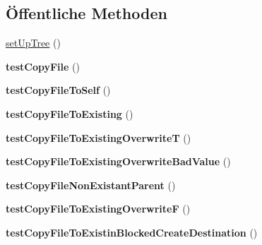 \subsection*{Öffentliche Methoden}
\begin{DoxyCompactItemize}
\item 
\mbox{\hyperlink{class_sabre_1_1_d_a_v_1_1_http_copy_test_aa1b891fcf2e616ce62273fd4fa173a90}{set\+Up\+Tree}} ()
\item 
\mbox{\label{class_sabre_1_1_d_a_v_1_1_http_copy_test_a1530fba319f8a4e55749ebdebb746da1}} 
{\bfseries test\+Copy\+File} ()
\item 
\mbox{\label{class_sabre_1_1_d_a_v_1_1_http_copy_test_a030a4723249e1176729c60753708c58a}} 
{\bfseries test\+Copy\+File\+To\+Self} ()
\item 
\mbox{\label{class_sabre_1_1_d_a_v_1_1_http_copy_test_a573bde730470604b682ac504487cecc3}} 
{\bfseries test\+Copy\+File\+To\+Existing} ()
\item 
\mbox{\label{class_sabre_1_1_d_a_v_1_1_http_copy_test_a6d9f95ad763363ed5166150ea71b62d0}} 
{\bfseries test\+Copy\+File\+To\+Existing\+OverwriteT} ()
\item 
\mbox{\label{class_sabre_1_1_d_a_v_1_1_http_copy_test_a08087f2022d8a2dd4cb4a858a0e31395}} 
{\bfseries test\+Copy\+File\+To\+Existing\+Overwrite\+Bad\+Value} ()
\item 
\mbox{\label{class_sabre_1_1_d_a_v_1_1_http_copy_test_ac643926130aac131adf79b5508326891}} 
{\bfseries test\+Copy\+File\+Non\+Existant\+Parent} ()
\item 
\mbox{\label{class_sabre_1_1_d_a_v_1_1_http_copy_test_a9452fd2b61a196bd2392cc8e4ac4995e}} 
{\bfseries test\+Copy\+File\+To\+Existing\+OverwriteF} ()
\item 
\mbox{\label{class_sabre_1_1_d_a_v_1_1_http_copy_test_aade5b0c73427118b6d341f794120bcd9}} 
{\bfseries test\+Copy\+File\+To\+Existin\+Blocked\+Create\+Destination} ()

\end{DoxyCompactItemize}

